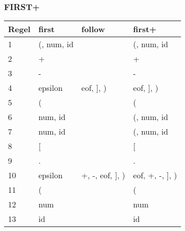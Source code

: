 \subsubsection{FIRST+}
\begin{tabular}{llll}
 Regel & first &  follow &  first+ \\
\hline
 1 & (, num, id & & (, num, id \\
 2 & + & & + \\
 3 & - & & - \\
 4 & epsilon & eof, ], ) & eof, ], ) \\
 5 & ( & & ( \\
 6 & num, id & & (, num, id \\
 7 & num, id & & (, num, id \\
 8 & [ & & [ \\
 9 & . & & . \\
10 & epsilon & +, -, eof, ], ) & eof, +, -, ], ) \\
11 & ( & & ( \\
12 & num & & num \\
13 & id & &  id \\
\end{tabular}
